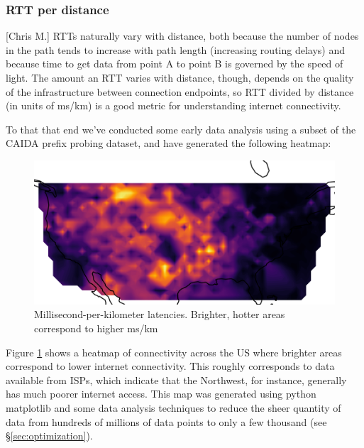 \documentclass[12pt]{article}
\begin{document}
\subsubsection{RTT per distance}[Chris M.]
RTTs naturally vary with distance, both because the number of nodes in the path tends to increase with path length (increasing routing delays) and because time to get data from point A to point B is governed by the speed of light. The amount an RTT varies with distance, though, depends on the quality of the infrastructure between connection endpoints, so RTT divided by distance (in units of ms/km) is a good metric for understanding internet connectivity.

To that that end we've conducted some early data analysis using a subset of the CAIDA prefix probing dataset, and have generated the following heatmap:

\begin{figure}[H]
    \centering
    \includegraphics[width=\textwidth]{images/CAIDA_connect_heatmap.png}
    \caption{Millisecond-per-kilometer latencies. Brighter, hotter areas correspond to higher ms/km}
    \label{fig:caida_connectivity_heatmap}
\end{figure}

Figure \ref{fig:caida_connectivity_heatmap} shows a heatmap of connectivity across the US where brighter areas correspond to lower internet connectivity. This roughly corresponds to data available from ISPs, which indicate that the Northwest, for instance, generally has much poorer internet access. This map was generated using python matplotlib and some data analysis techniques to reduce the sheer quantity of data from hundreds of millions of data points to only a few thousand (see \S{}\ref{sec:optimization}).
\end{document}
